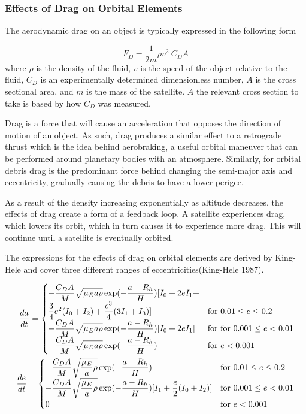 \documentclass{article}
\begin{document}
\subsubsection{Effects of Drag on Orbital Elements}

The aerodynamic drag on an object is typically expressed in the following form

\begin{equation}
	F_D = \frac{1}{2m} \rho v^2 \: C_D A
\end{equation}
where $\rho$ is the density of the fluid, $v$ is the speed of the object relative to the fluid, $C_D$ is an experimentally determined dimensionless number, $A$ is the cross sectional area, and $m$ is the mass of the satellite. $A$ the relevant cross section to take is based by how $C_D$ was measured. 

Drag is a force that will cause an acceleration that opposes the direction of motion of an object. As such, drag produces a similar effect to a retrograde thrust which is the idea behind aerobraking, a useful orbital maneuver that can be performed around planetary bodies with an atmosphere. Similarly, for orbital debris drag is the predominant force behind changing the semi-major axis and eccentricity, gradually causing the debris to have a lower perigee. 

As a result of the density increasing exponentially as altitude decreases, the effects of drag create a form of a feedback loop. A satellite experiences drag, which lowers its orbit, which in turn causes it to experience more drag. This will continue until a satellite is eventually orbited. 

The expressions for the effects of drag on orbital elements are derived by King-Hele and cover three different ranges of eccentricities(King-Hele 1987).

\begin{align}
		\dfrac{da}{dt} = \begin{cases}
			-\dfrac{C_D A}{M} \sqrt{\mathstrut\mu_E a \rho} \exp(-\dfrac{a - R_h}{H})[I_0 
			+ 2eI_1 + \\ \dfrac{3}{4}e^2(I_0 + I_2) + \dfrac{e^3}{4}(3I_1 +I_3)] & \text{for } 0.01 \leq e \leq 0.2 \\
			-\dfrac{C_D A}{M} \sqrt{\mathstrut\mu_E a \rho}\exp(-\dfrac{a - R_h}{H})[I_0 + 2eI_1 ] & \text{for } \text{for } 0.001 \leq e < 0.01\\
			-\dfrac{C_D A}{M} \sqrt{\mathstrut\mu_E a \rho}\exp(-\dfrac{a - R_h}{H}) & \text{for } e < 0.001
		\end{cases}\\
		\newline
		\dfrac{de}{dt} = \begin{cases}
			-\dfrac{C_D A}{M} \sqrt{\mathstrut\dfrac{\mu_E}{a} \rho}\exp(-\dfrac{a - R_h}{H}) & \text{for } 0.01 \leq e \leq 0.2  \\
			-\dfrac{C_D A}{M} \sqrt{\mathstrut\dfrac{\mu_E}{a} \rho}\exp(-\dfrac{a - R_h}{H})[I_1 + \dfrac{e}{2}(I_0 + I_2)] & \text{for } 0.001 \leq e < 0.01\\
			0 & \text{for } e < 0.001
		\end{cases}
	\end{align}
\end{document}
